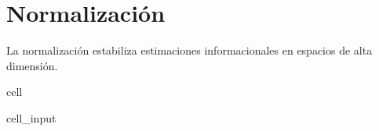 \documentclass[letterpaper,10pt,english]{jupyterBook}
\begin{document}
\section{Normalización}
\label{\detokenize{03_multivariate_models/high_dimensional:normalizacion}}
\sphinxAtStartPar
La normalización estabiliza estimaciones informacionales
en espacios de alta dimensión.

\begin{sphinxuseclass}{cell}\begin{sphinxVerbatimInput}

\begin{sphinxuseclass}{cell_input}
\begin{sphinxVerbatim}[commandchars=\\\{\}]
  
  
\end{sphinxVerbatim}

\end{sphinxuseclass}\end{sphinxVerbatimInput}

\end{sphinxuseclass}
\end{document}
